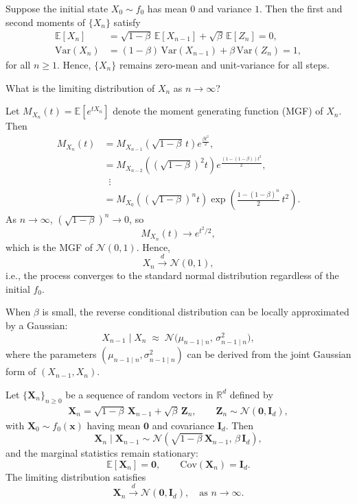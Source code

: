 \documentclass{article}
\begin{document}
Suppose the initial state $X_0 \sim f_0$ has mean $0$ and variance $1$.  
Then the first and second moments of $\{X_n\}$ satisfy
\begin{align}
    \mathbb{E}[X_n] 
    &= \sqrt{1-\beta}\,\mathbb{E}[X_{n-1}] + \sqrt{\beta}\,\mathbb{E}[Z_n]
    = 0,\\
    \mathrm{Var}(X_n) 
    &= (1-\beta)\,\mathrm{Var}(X_{n-1}) + \beta\,\mathrm{Var}(Z_n)
    = 1,
\end{align}
for all $n \ge 1$. Hence, $\{X_n\}$ remains zero-mean and unit-variance for all steps.

\begin{exercise}
    What is the limiting distribution of $X_n$ as $n \to \infty$?
\end{exercise}

Let $M_{X_n}(t)=\mathbb{E}[e^{tX_n}]$ denote the moment generating function (MGF) of $X_n$.
Then
\begin{align}
    M_{X_n}(t)
    &= M_{X_{n-1}}\!\left(\sqrt{1-\beta}\,t\right)
       e^{\frac{\beta t^2}{2}},\\
    &= M_{X_{n-2}}\!\left((\sqrt{1-\beta})^2 t\right)
       e^{\frac{(1-(1-\beta))t^2}{2}},\\
    &\;\;\vdots\\
    &= M_{X_0}\!\left((\sqrt{1-\beta})^n t\right)
       \exp\!\left(\tfrac{1 - (1-\beta)^n}{2}\,t^2\right).
\end{align}
As $n \to \infty$, $(\sqrt{1-\beta})^n \to 0$, so
\[
M_{X_n}(t) \to e^{t^2/2},
\]
which is the MGF of $\mathcal{N}(0,1)$.  
Hence,
\[
X_n \xrightarrow{d} \mathcal{N}(0,1),
\]
i.e., the process converges to the standard normal distribution regardless of the initial $f_0$.

When $\beta$ is small, the reverse conditional distribution can be locally approximated by a Gaussian:
\[
X_{n-1} \mid X_n 
\;\approx\; \mathcal{N}\!\big(\mu_{n-1\mid n},\, \sigma_{n-1\mid n}^2\big),
\]
where the parameters $(\mu_{n-1\mid n}, \sigma_{n-1\mid n}^2)$ can be derived from the joint Gaussian form of $(X_{n-1}, X_n)$.

\bigskip

Let $\{\mathbf{X}_n\}_{n\ge0}$ be a sequence of random vectors in $\mathbb{R}^d$ defined by
\begin{align}
    \mathbf{X}_n 
    = \sqrt{1-\beta}\, \mathbf{X}_{n-1} 
    + \sqrt{\beta}\, \mathbf{Z}_n,
    \qquad \mathbf{Z}_n \sim \mathcal{N}(\mathbf{0}, \mathbf{I}_d),
\end{align}
with $\mathbf{X}_0 \sim f_0(\mathbf{x})$ having mean $\mathbf{0}$ and covariance $\mathbf{I}_d$.
Then
\[
\mathbf{X}_n \mid \mathbf{X}_{n-1} 
\sim \mathcal{N}\!\left(
    \sqrt{1-\beta}\,\mathbf{X}_{n-1},\,
    \beta\,\mathbf{I}_d
\right),
\]
and the marginal statistics remain stationary:
\[
\mathbb{E}[\mathbf{X}_n] = \mathbf{0},
\qquad
\mathrm{Cov}(\mathbf{X}_n) = \mathbf{I}_d.
\]
The limiting distribution satisfies
\[
\mathbf{X}_n \xrightarrow{d} \mathcal{N}(\mathbf{0}, \mathbf{I}_d),
\quad \text{as } n \to \infty.
\]
\end{document}
